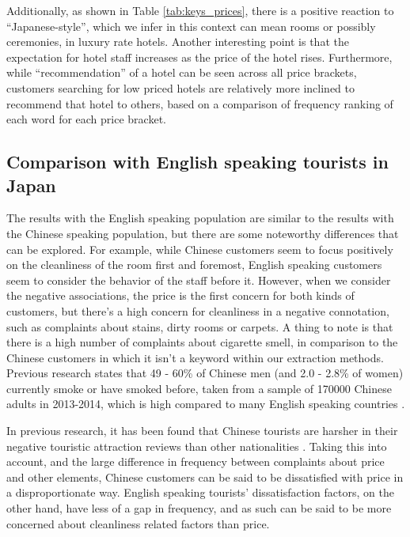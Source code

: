 \documentclass[review]{elsarticle}
\begin{document}
Additionally, as shown in Table \ref{tab:keys_prices}, there is a positive reaction to “Japanese-style”, which we infer in this context can mean rooms or possibly ceremonies, in luxury rate hotels. Another interesting point is that the expectation for hotel staff increases as the price of the hotel rises. Furthermore, while “recommendation” of a hotel can be seen across all price brackets, customers searching for low priced hotels are relatively more inclined to recommend that hotel to others, based on a comparison of frequency ranking of each word for each price bracket.

\subsection{Comparison with English speaking tourists in Japan}

The results with the English speaking population are similar to the results with the Chinese speaking population, but there are some noteworthy differences that can be explored. For example, while Chinese customers seem to focus positively on the cleanliness of the room first and foremost, English speaking customers seem to consider the behavior of the staff before it. However, when we consider the negative associations, the price is the first concern for both kinds of customers, but there's a high concern for cleanliness in a negative connotation, such as complaints about stains, dirty rooms or carpets. A thing to note is that there is a high number of complaints about cigarette smell, in comparison to the Chinese customers in which it isn't a keyword within our extraction methods. Previous research states that 49 - 60\% of Chinese men (and 2.0 - 2.8\% of women) currently smoke or have smoked before, taken from a sample of \num[group-separator={,}]{170000} Chinese adults in 2013-2014, which is high compared to many English speaking countries \cite[][]{zhang2019tobacco, who2015tobacco}. 

In previous research, it has been found that Chinese tourists are harsher in their negative touristic attraction reviews than other nationalities \cite[][]{LIU2019337}. Taking this into account, and the large difference in frequency between complaints about price and other elements, Chinese customers can be said to be dissatisfied with price in a disproportionate way. English speaking tourists' dissatisfaction factors, on the other hand, have less of a gap in frequency, and as such can be said to be more concerned about cleanliness related factors than price.
\end{document}
